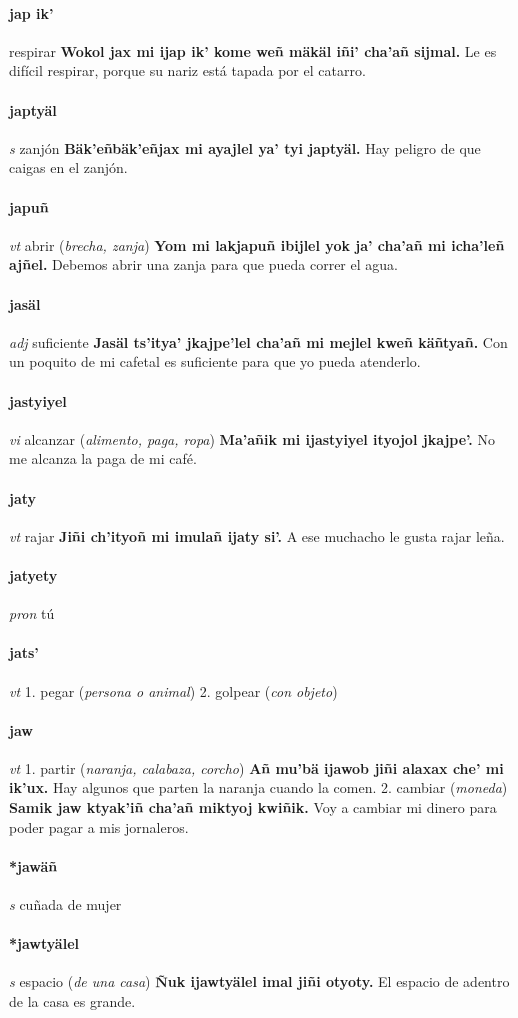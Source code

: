 \documentclass{scrbook}
\newcommand{\entry}[1]{\paragraph{#1}}
\newcommand{\onedefinition}[1]{#1.}
\newcommand{\partofspeech}[1]{\textit{#1}}
\newcommand{\spanishtranslation}[1]{#1}
\newcommand{\clarification}[1]{(\textit{#1})}
\newcommand{\cholexample}[1]{\textbf{#1}}
\newcommand{\exampletranslation}[1]{#1}
\begin{document}
\begin{multicols}{2}
\entry{jap ik'}
\spanishtranslation{respirar}
\cholexample{Wokol jax mi ijap ik' kome weñ mäkäl iñi' cha'añ sijmal.}
\exampletranslation{Le es difícil respirar, porque su nariz está tapada por el catarro.}

\entry{japtyäl}
\partofspeech{s}
\spanishtranslation{zanjón}
\cholexample{Bäk'eñbäk'eñjax mi ayajlel ya' tyi japtyäl.}
\exampletranslation{Hay peligro de que caigas en el zanjón.}

\entry{japuñ}
\partofspeech{vt}
\spanishtranslation{abrir}
\clarification{brecha, zanja}
\cholexample{Yom mi lakjapuñ ibijlel yok ja' cha'añ mi icha'leñ ajñel.}
\exampletranslation{Debemos abrir una zanja para que pueda correr el agua.}

\entry{jasäl}
\partofspeech{adj}
\spanishtranslation{suficiente}
\cholexample{Jasäl ts'itya' jkajpe'lel cha'añ mi mejlel kweñ käñtyañ.}
\exampletranslation{Con un poquito de mi cafetal es suficiente para que yo pueda atenderlo.}

\entry{jastyiyel}
\partofspeech{vi}
\spanishtranslation{alcanzar}
\clarification{alimento, paga, ropa}
\cholexample{Ma'añik mi ijastyiyel ityojol jkajpe'.}
\exampletranslation{No me alcanza la paga de mi café.}

\entry{jaty}
\partofspeech{vt}
\spanishtranslation{rajar}
\cholexample{Jiñi ch'ityoñ mi imulañ ijaty si'.}
\exampletranslation{A ese muchacho le gusta rajar leña.}

\entry{jatyety}
\partofspeech{pron}
\spanishtranslation{tú}

\entry{jats'}
\partofspeech{vt}
\onedefinition{1}
\spanishtranslation{pegar}
\clarification{persona o animal}
\onedefinition{2}
\spanishtranslation{golpear}
\clarification{con objeto}

\entry{jaw}
\partofspeech{vt}
\onedefinition{1}
\spanishtranslation{partir}
\clarification{naranja, calabaza, corcho}
\cholexample{Añ mu'bä ijawob jiñi alaxax che' mi ik'ux.}
\exampletranslation{Hay algunos que parten la naranja cuando la comen.}
\onedefinition{2}
\spanishtranslation{cambiar}
\clarification{moneda}
\cholexample{Samik jaw ktyak'iñ cha'añ miktyoj kwiñik.}
\exampletranslation{Voy a cambiar mi dinero para poder pagar a mis jornaleros.}

\entry{*jawäñ}
\partofspeech{s}
\spanishtranslation{cuñada de mujer}

\entry{*jawtyälel}
\partofspeech{s}
\spanishtranslation{espacio}
\clarification{de una casa}
\cholexample{Ñuk ijawtyälel imal jiñi otyoty.}
\exampletranslation{El espacio de adentro de la casa es grande.}


\end{multicols}
\end{document}
